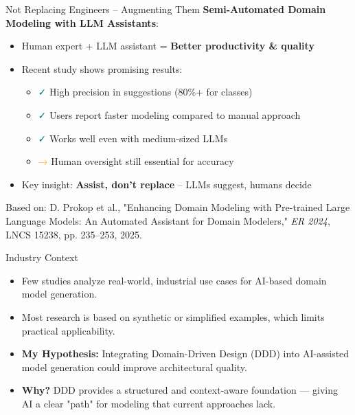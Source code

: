 \documentclass[aspectratio=169,12pt]{beamer}
\begin{document}
\begin{frame}{Not Replacing Engineers – Augmenting Them}
    \textbf{Semi-Automated Domain Modeling with LLM Assistants}:
    \begin{itemize}
        \item Human expert + LLM assistant = \textbf{Better productivity \& quality}
        \item Recent study shows promising results:
        \begin{itemize}
            \item \textcolor{teal}{✓} High precision in suggestions (80\%+ for classes)
            \item \textcolor{teal}{✓} Users report faster modeling compared to manual approach
            \item \textcolor{teal}{✓} Works well even with medium-sized LLMs
            \item \textcolor{orange}{→} Human oversight still essential for accuracy
        \end{itemize}
        \item Key insight: \textbf{Assist, don't replace} – LLMs suggest, humans decide
    \end{itemize}
    \vspace{0.3cm}
    \tiny{
        Based on: D. Prokop et al., "Enhancing Domain Modeling with Pre-trained Large Language Models: An Automated Assistant for Domain Modelers,"
        \textit{ER 2024}, LNCS 15238, pp. 235–253, 2025.
    }
    \end{frame}

\begin{frame}{Industry Context}

    \begin{itemize}
        \item Few studies analyze real-world, industrial use cases for AI-based domain model generation.
        
        \item Most research is based on synthetic or simplified examples, which limits practical applicability.
        
        \item \textbf{My Hypothesis:} Integrating Domain-Driven Design (DDD) into AI-assisted model generation could improve architectural quality.
        
        \item \textbf{Why?} DDD provides a structured and context-aware foundation — giving AI a clear "path" for modeling that current approaches lack.
    \end{itemize}
    
\end{frame}
\end{document}
